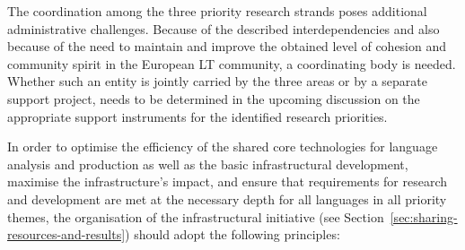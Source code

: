 \documentclass[10pt, plain]{../../metanetpaper}
\begin{document}
\begin{multicols}{2}
The coordination among the three priority research strands poses additional administrative challenges. Because of the described interdependencies and also because of the need to maintain and improve the obtained level of cohesion and community spirit in the European LT community, a coordinating body is needed. Whether such an entity is jointly carried by the three areas or by a separate support project, needs to be determined in the upcoming discussion on the appropriate support instruments for the identified research priorities.




In order to optimise the efficiency of the shared core technologies for language analysis and production as well as the basic infrastructural development, maximise the infrastructure's impact, and ensure that requirements for research and development are met at the necessary depth for all languages in all priority themes, the organisation of the infrastructural initiative (see Section~\ref{sec:sharing-resources-and-results}) should adopt the following principles:


\end{multicols}
\end{document}
